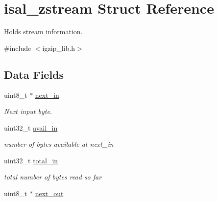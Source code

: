 \hypertarget{structisal__zstream}{\section{isal\-\_\-zstream Struct Reference}
\label{structisal__zstream}
}


Holds stream information.  




{\ttfamily \#include $<$igzip\-\_\-lib.\-h$>$}

\subsection*{Data Fields}
\begin{DoxyCompactItemize}
\item 
\hypertarget{structisal__zstream_ad1af5ae0aed97539bcfcb932444363c0}{uint8\-\_\-t $\ast$ \hyperlink{structisal__zstream_ad1af5ae0aed97539bcfcb932444363c0}{next\-\_\-in}}\label{structisal__zstream_ad1af5ae0aed97539bcfcb932444363c0}

\begin{DoxyCompactList}\small\item\em Next input byte. \end{DoxyCompactList}\item 
\hypertarget{structisal__zstream_a104ab8b7139e790ceca4c4bfe4277b1c}{uint32\-\_\-t \hyperlink{structisal__zstream_a104ab8b7139e790ceca4c4bfe4277b1c}{avail\-\_\-in}}\label{structisal__zstream_a104ab8b7139e790ceca4c4bfe4277b1c}

\begin{DoxyCompactList}\small\item\em number of bytes available at next\-\_\-in \end{DoxyCompactList}\item 
\hypertarget{structisal__zstream_af5405009f71758d2b2eddd16229011b8}{uint32\-\_\-t \hyperlink{structisal__zstream_af5405009f71758d2b2eddd16229011b8}{total\-\_\-in}}\label{structisal__zstream_af5405009f71758d2b2eddd16229011b8}

\begin{DoxyCompactList}\small\item\em total number of bytes read so far \end{DoxyCompactList}\item 
\hypertarget{structisal__zstream_a2a7525f6fc85d0f7de399474d4c723bc}{uint8\-\_\-t $\ast$ \hyperlink{structisal__zstream_a2a7525f6fc85d0f7de399474d4c723bc}{next\-\_\-out}}\label{structisal__zstream_a2a7525f6fc85d0f7de399474d4c723bc}


\end{DoxyCompactItemize}
